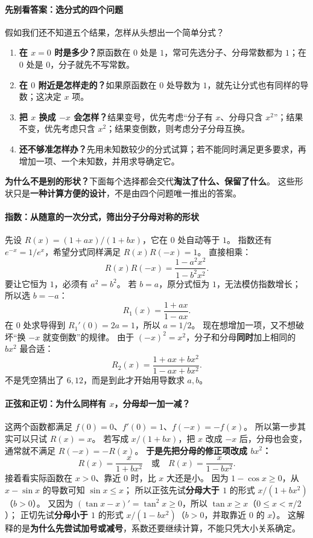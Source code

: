 \begin{explanationbox}
\paragraph{先别看答案：选分式的四个问题}
假如我们还不知道五个结果，怎样从头想出一个简单分式？
\begin{enumerate}
\item \textbf{在 $x=0$ 时是多少？}原函数在 $0$ 处是 $1$，常可先选分子、分母常数都为 $1$；在 $0$ 处是 $0$，分子就先不写常数。
\item \textbf{在 $0$ 附近是怎样走的？}如果原函数在 $0$ 处导数为 $1$，就先让分式也有同样的导数；这决定 $x$ 项。
\item \textbf{把 $x$ 换成 $-x$ 会怎样？}结果变号，优先考虑“分子有 $x$、分母只含 $x^2$”；结果不变，优先考虑只含 $x^2$；结果变倒数，则考虑分子分母互换。
\item \textbf{还不够准怎样办？}先用未知数较少的分式试算；若不能同时满足更多要求，再增加一项、一个未知数，并用求导确定它。
\end{enumerate}
\textbf{为什么不是别的形状？}下面每个选择都会交代\textbf{淘汰了什么、保留了什么}。
这些形状只是\textbf{一种计算方便的设计}，不是由四个问题唯一推出的答案。

\paragraph{指数：从随意的一次分式，筛出分子分母对称的形状}
先设 $R(x)=(1+ax)/(1+bx)$，它在 $0$ 处自动等于 $1$。
指数还有 $e^{-x}=1/e^x$，希望分式同样满足 $R(x)R(-x)=1$。
直接相乘：
\[
 R(x)R(-x)=\frac{1-a^2x^2}{1-b^2x^2}.
\]
要让它恒为 $1$，必须有 $a^2=b^2$。
若 $b=a$，原分式恒为 $1$，无法模仿指数增长；所以选 $b=-a$：
\[
 R_1(x)=\frac{1+ax}{1-ax}.
\]
在 $0$ 处求导得到 $R_1'(0)=2a=1$，所以 $a=1/2$。
现在想增加一项，又不想破坏“换 $-x$ 就变倒数”的规律。
由于 $(-x)^2=x^2$，分子和分母\textbf{同时}加上相同的 $bx^2$ 最合适：
\[
 R_2(x)=\frac{1+ax+bx^2}{1-ax+bx^2}.
\]
不是凭空猜出了 $6,12$，而是到此才开始用导数求 $a,b$。

\paragraph{正弦和正切：为什么同样有 $x$，分母却一加一减？}
这两个函数都满足 $f(0)=0$、$f'(0)=1$、$f(-x)=-f(x)$。
所以第一步其实可以只试 $R(x)=x$。
若写成 $x/(1+bx)$，把 $x$ 改成 $-x$ 后，分母也会变，
通常就不满足 $R(-x)=-R(x)$。
\textbf{于是先把分母的修正项改成 $bx^2$：}
\[
 R(x)=\frac{x}{1+bx^2}\quad\text{或}\quad R(x)=\frac{x}{1-bx^2}.
\]
接着看实际函数在 $x>0$、靠近 $0$ 时，比 $x$ 大还是小。
因为 $1-\cos x\ge0$，从 $x-\sin x$ 的导数可知 $\sin x\le x$；
所以正弦先试\textbf{分母大于 $1$} 的形式 $x/(1+bx^2)$（$b>0$）。
又因为 $(\tan x-x)'=\tan^2x\ge0$，所以 $\tan x\ge x$（$0\le x<\pi/2$）；
正切先试\textbf{分母小于 $1$} 的形式 $x/(1-bx^2)$（$b>0$，并取靠近 $0$ 的 $x$）。
这解释的是\textbf{为什么先尝试加号或减号}，系数还要继续计算，不能只凭大小关系确定。


\end{explanationbox}
